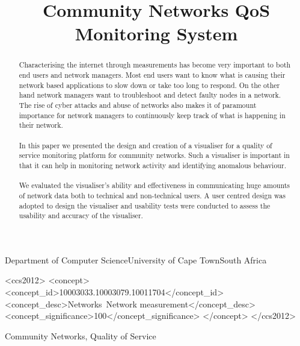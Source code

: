 \documentclass[plain]{sigplanconf}
\begin{document}
	\title{Community Networks QoS Monitoring System}

	{Department of Computer Science\linebreak University of Cape Town\linebreak South Africa}
	{}
	\maketitle
	\begin{abstract}
	\paragraph{}
	Characterising the internet through measurements has become very important to both end users and network
	managers. Most end users want to know what is causing their network based applications to slow down or take too long to respond. On the other hand network managers want to troubleshoot and detect faulty nodes in a network. The rise of cyber attacks and abuse of networks also makes it of paramount importance for network managers to continuously keep track of what is happening in their network.
	\paragraph{}
	In this paper we presented the design and creation of a visualiser for a quality of service monitoring platform for community networks. Such a visualiser is important in that it can help in monitoring network activity and identifying anomalous behaviour.
	\paragraph{}
	We evaluated the visualiser's ability and effectiveness in communicating huge amounts of network data both to technical and non-technical users. A user centred design was adopted to design the visualiser and usability tests were conducted to assess the usability and accuracy of the visualiser.
	\paragraph{}
	
	\end{abstract}
	\begin{CCSXML}
		<ccs2012>
		<concept>
		<concept_id>10003033.10003079.10011704</concept_id>
		<concept_desc>Networks~Network measurement</concept_desc>
		<concept_significance>100</concept_significance>
		</concept>
		</ccs2012>
	\end{CCSXML}
	\keywords
	Community Networks, Quality of Service
	








	
	
%	
\end{document}
